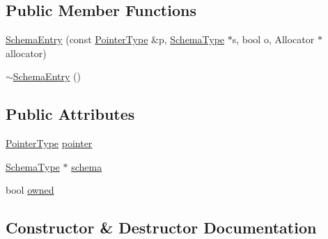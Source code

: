 \subsection*{Public Member Functions}
\begin{DoxyCompactItemize}
\item 
\hyperlink{structGenericSchemaDocument_1_1SchemaEntry_ae5bb43ef093b5efe2f72df196aaa4b87}{Schema\+Entry} (const \hyperlink{classGenericSchemaDocument_aeb62f562d4dc024402b00f97cbcef747}{Pointer\+Type} \&p, \hyperlink{classGenericSchemaDocument_acaf115202b159a2eb72c97c3dc6c3895}{Schema\+Type} $\ast$s, bool o, Allocator $\ast$allocator)
\item 
\hyperlink{structGenericSchemaDocument_1_1SchemaEntry_a4c18d6d563b90be5cb16e66173bb0107}{$\sim$\+Schema\+Entry} ()
\end{DoxyCompactItemize}
\subsection*{Public Attributes}
\begin{DoxyCompactItemize}
\item 
\hyperlink{classGenericSchemaDocument_aeb62f562d4dc024402b00f97cbcef747}{Pointer\+Type} \hyperlink{structGenericSchemaDocument_1_1SchemaEntry_a55cb1fc9735973d1b4c4e481541d9e00}{pointer}
\item 
\hyperlink{classGenericSchemaDocument_acaf115202b159a2eb72c97c3dc6c3895}{Schema\+Type} $\ast$ \hyperlink{structGenericSchemaDocument_1_1SchemaEntry_ae43ba2bb10eaece15ac9dc6eeaeb5ecf}{schema}
\item 
bool \hyperlink{structGenericSchemaDocument_1_1SchemaEntry_a271f46ff3e4978d13b46739d107637ec}{owned}
\end{DoxyCompactItemize}


\subsection{Constructor \& Destructor Documentation}
\mbox{\label{structGenericSchemaDocument_1_1SchemaEntry_ae5bb43ef093b5efe2f72df196aaa4b87}} 
